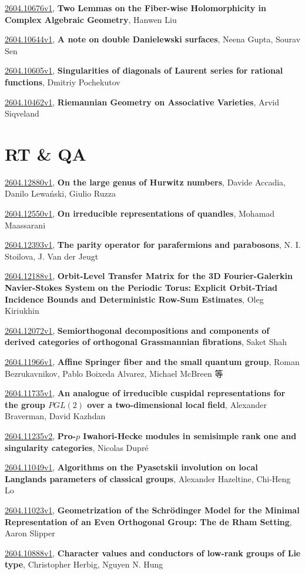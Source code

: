 \documentclass[9pt, a4paper]{article}
\theoremstyle{plain}
\theoremstyle{definition}
\theoremstyle{remark}
\newcommand{\arxiv}[3]{\href{https://arxiv.org/abs/#1}{#1}, \textbf{\textcolor{arxivblue}{#2}}, #3}
\begin{document}
\arxiv{2604.10676v1}{Two Lemmas on the Fiber-wise Holomorphicity in Complex Algebraic Geometry}{Hanwen Liu}

\arxiv{2604.10644v1}{A note on double Danielewski surfaces}{Neena Gupta, Sourav Sen}

\arxiv{2604.10605v1}{Singularities of diagonals of Laurent series for rational functions}{Dmitriy Pochekutov}

\arxiv{2604.10462v1}{Riemannian Geometry on Associative Varieties}{Arvid Siqveland}


\section{RT \& QA}
\arxiv{2604.12880v1}{On the large genus of Hurwitz numbers}{Davide Accadia, Danilo Lewański, Giulio Ruzza}

\arxiv{2604.12550v1}{On irreducible representations of quandles}{Mohamad Maassarani}

\arxiv{2604.12393v1}{The parity operator for parafermions and parabosons}{N. I. Stoilova, J. Van der Jeugt}

\arxiv{2604.12188v1}{Orbit-Level Transfer Matrix for the 3D Fourier-Galerkin Navier-Stokes System on the Periodic Torus: Explicit Orbit-Triad Incidence Bounds and Deterministic Row-Sum Estimates}{Oleg Kiriukhin}

\arxiv{2604.12072v1}{Semiorthogonal decompositions and components of derived categories of orthogonal Grassmannian fibrations}{Saket Shah}

\arxiv{2604.11966v1}{Affine Springer fiber and the small quantum group}{Roman Bezrukavnikov, Pablo Boixeda Alvarez, Michael McBreen 等}

\arxiv{2604.11735v1}{An analogue of irreducible cuspidal representations for the group $PGL(2)$ over a two-dimensional local field}{Alexander Braverman, David Kazhdan}

\arxiv{2604.11235v2}{Pro-$p$ Iwahori-Hecke modules in semisimple rank one and singularity categories}{Nicolas Dupré}

\arxiv{2604.11049v1}{Algorithms on the Pyasetskii involution on local Langlands parameters of classical groups}{Alexander Hazeltine, Chi-Heng Lo}

\arxiv{2604.11023v1}{Geometrization of the Schrödinger Model for the Minimal Representation of an Even Orthogonal Group: The de Rham Setting}{Aaron Slipper}

\arxiv{2604.10888v1}{Character values and conductors of low-rank groups of Lie type}{Christopher Herbig, Nguyen N. Hung}
\end{document}
